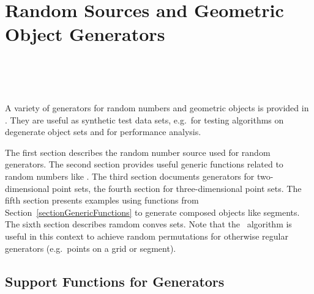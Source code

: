 
\beforecprogskip\medskipamount
\aftercprogskip\medskipamount
\ccParDims

\chapter{Random Sources and Geometric Object Generators}
\label{chapterGenerators}
\\
\\
\\


A variety of generators for random numbers and geometric objects is
provided in \cgal.  They are useful as synthetic test data sets,
e.g.~for testing algorithms on degenerate object sets and for
performance analysis.

The first section describes the random number source used for random
generators. The second section provides useful generic functions
related to random numbers like . The
third section documents generators for two-dimensional point sets, the
fourth section for three-dimensional point sets. The fifth section
presents examples using functions from
Section~\ref{sectionGenericFunctions} to generate composed objects
like segments. The sixth section describes ramdom conves sets.
 Note that the \stl\ algorithm  is
useful in this context to achieve random permutations for otherwise
regular generators (e.g.~points on a grid or segment).




\section{Support Functions for Generators}


